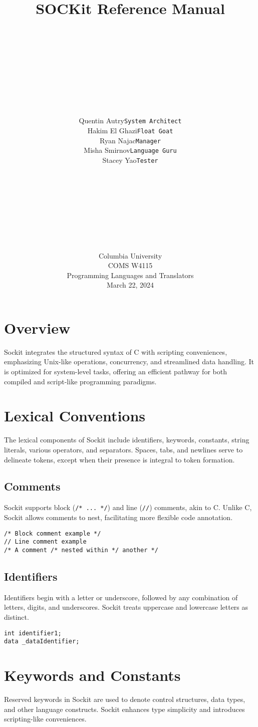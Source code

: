\documentclass[12pt,a4paper]{article} %
\title{SOCKit Reference Manual}
\author{
    \begin{tabular}{rl} %
    & \\
    & \\
    & \\
    & \\
    & \\
    & \\
    & \\
    & \\
    & \\
    Quentin Autry & \texttt{System Architect} \\
    Hakim El Ghazi & \texttt{Float Goat} \\
    Ryan Najac & \texttt{Manager} \\
    Misha Smirnov & \texttt{Language Guru} \\
    Stacey Yao & \texttt{Tester} \\
    & \\
    & \\
    & \\
    & \\
    & \\
    & \\
    & \\
    & \\
    & \\
    \end{tabular}
}
\date{Columbia University\\COMS W4115\\Programming Languages and Translators\\March 22, 2024}
\begin{document}
\maketitle
\thispagestyle{empty}
\newpage
\tableofcontents
\newpage
\section{Overview}
Sockit integrates the structured syntax of C with scripting conveniences, emphasizing Unix-like operations, concurrency, and streamlined data handling. It is optimized for system-level tasks, offering an efficient pathway for both compiled and script-like programming paradigms.

\section{Lexical Conventions}
The lexical components of Sockit include identifiers, keywords, constants, string literals, various operators, and separators. Spaces, tabs, and newlines serve to delineate tokens, except when their presence is integral to token formation.

\subsection{Comments}
Sockit supports block (\texttt{/* ... */}) and line (\texttt{//}) comments, akin to C. Unlike C, Sockit allows comments to nest, facilitating more flexible code annotation.

\begin{verbatim}
/* Block comment example */
// Line comment example
/* A comment /* nested within */ another */
\end{verbatim}

\subsection{Identifiers}
Identifiers begin with a letter or underscore, followed by any combination of letters, digits, and underscores. Sockit treats uppercase and lowercase letters as distinct.

\begin{verbatim}
int identifier1;
data _dataIdentifier;
\end{verbatim}

\section{Keywords and Constants}
Reserved keywords in Sockit are used to denote control structures, data types, and other language constructs. Sockit enhances type simplicity and introduces scripting-like conveniences.
\end{document}
